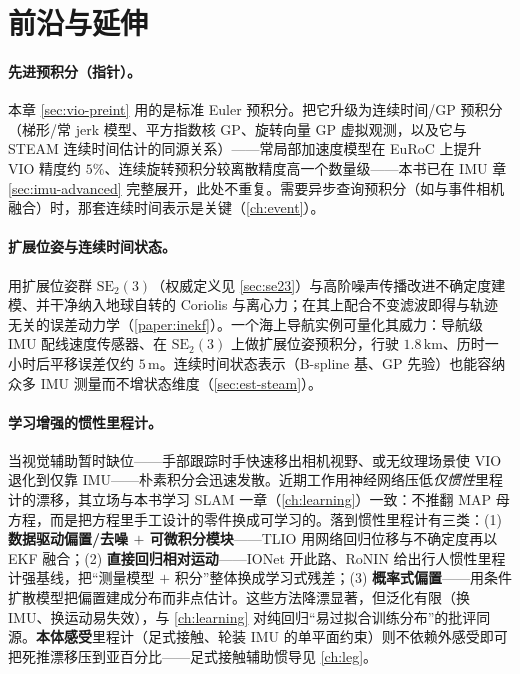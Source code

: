 \section{前沿与延伸}
\label{sec:vio-frontier}

\paragraph{先进预积分（指针）。}
本章 \cref{sec:vio-preint} 用的是标准 Euler 预积分。把它升级为连续时间/GP 预积分（梯形/常 jerk 模型、平方指数核 GP、旋转向量 GP 虚拟观测，以及它与 STEAM 连续时间估计的同源关系）——常局部加速度模型在 EuRoC 上提升 VIO 精度约 $5\%$、连续旋转预积分较离散精度高一个数量级——本书已在 IMU 章 \cref{sec:imu-advanced} 完整展开，此处不重复。需要异步查询预积分（如与事件相机融合）时，那套连续时间表示是关键（\cref{ch:event}）。

\paragraph{扩展位姿与连续时间状态。}
用扩展位姿群 $\mathrm{SE}_2(3)$（权威定义见 \cref{sec:se23}）与高阶噪声传播改进不确定度建模、并干净纳入地球自转的 Coriolis 与离心力\cite{brossard2021associating}；在其上配合不变滤波即得与轨迹无关的误差动力学（\cref{paper:inekf}）。一个海上导航实例可量化其威力：导航级 IMU 配线速度传感器、在 $\mathrm{SE}_2(3)$ 上做扩展位姿预积分，行驶 $1.8\,\mathrm{km}$、历时一小时后平移误差仅约 $5\,\mathrm m$\cite{carlone2026handbook}。连续时间状态表示（B-spline 基、GP 先验）也能容纳众多 IMU 测量而不增状态维度（\cref{sec:est-steam}）。

\paragraph{学习增强的惯性里程计。}
当视觉辅助暂时缺位——手部跟踪时手快速移出相机视野、或无纹理场景使 VIO 退化到仅靠 IMU——朴素积分会迅速发散。近期工作用神经网络压低\emph{仅惯性}里程计的漂移，其立场与本书学习 SLAM 一章（\cref{ch:learning}）一致：不推翻 MAP 母方程，而是把方程里手工设计的零件换成可学习的。落到惯性里程计有三类：(1) \textbf{数据驱动偏置/去噪 $+$ 可微积分模块}——TLIO\cite{liu2020tlio} 用网络回归位移与不确定度再以 EKF 融合；(2) \textbf{直接回归相对运动}——IONet\cite{chen2018ionet} 开此路、RoNIN\cite{herath2020ronin} 给出行人惯性里程计强基线，把“测量模型 $+$ 积分”整体换成学习式残差；(3) \textbf{概率式偏置}——用条件扩散模型把偏置建成分布而非点估计\cite{carlone2026handbook}。这些方法降漂显著，但泛化有限（换 IMU、换运动易失效），与 \cref{ch:learning} 对纯回归“易过拟合训练分布”的批评同源。\textbf{本体感受}里程计（足式接触、轮装 IMU 的单平面约束）则不依赖外感受即可把死推漂移压到亚百分比——足式接触辅助惯导见 \cref{ch:leg}。

